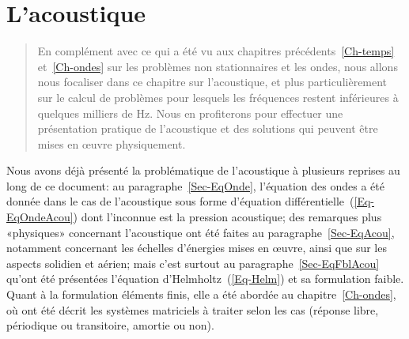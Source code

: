 \chapter{L'acoustique}\label{Ch-Acous}
\begin{abstract}
En complément avec ce qui a été vu aux chapitres précédents~\ref{Ch-temps} et~\ref{Ch-ondes} sur les problèmes non stationnaires et les ondes, nous allons nous focaliser dans ce chapitre sur l'acoustique, et plus particulièrement sur le calcul de problèmes pour lesquels les fréquences restent inférieures à quelques milliers de Hz. Nous en profiterons pour effectuer une présentation pratique de l'acoustique et des solutions qui peuvent être mises en œuvre physiquement.
\end{abstract}

Nous avons déjà présenté la problématique de l'acoustique à plusieurs reprises au long de ce document: au paragraphe~\ref{Sec-EqOnde}, l'équation des ondes a été donnée dans le cas de l'acoustique sous forme d'équation différentielle~(\ref{Eq-EqOndeAcou}) dont l'inconnue est la pression acoustique; des remarques plus «physiques» concernant l'acoustique ont été faites au paragraphe~\ref{Sec-EqAcou}, notamment concernant les échelles d'énergies mises en œuvre, ainsi que sur les aspects solidien et aérien; mais c'est surtout au paragraphe~\ref{Sec-EqFblAcou} qu'ont été présentées l'équation d'Helmholtz~(\ref{Eq-Helm}) et sa formulation faible. Quant à la formulation éléments finis, elle a été abordée au chapitre~\ref{Ch-ondes}, où ont été décrit les systèmes matriciels à traiter selon les cas (réponse libre, périodique ou transitoire, amortie ou non).

